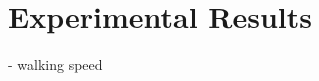 \section{Experimental Results}
\label{text:experiments/results}

- walking speed \cite{Bohannon1997}
